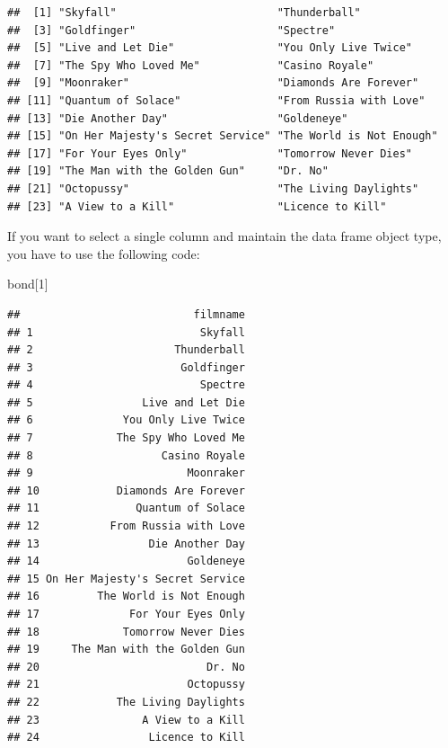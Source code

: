 \documentclass[
]{book}
\newenvironment{Shaded}{\begin{snugshade}}{\end{snugshade}}
\newcommand{\DecValTok}[1]{\textcolor[rgb]{0.00,0.00,0.81}{#1}}
\newcommand{\NormalTok}[1]{#1}
\begin{document}
\begin{verbatim}
##  [1] "Skyfall"                         "Thunderball"                    
##  [3] "Goldfinger"                      "Spectre"                        
##  [5] "Live and Let Die"                "You Only Live Twice"            
##  [7] "The Spy Who Loved Me"            "Casino Royale"                  
##  [9] "Moonraker"                       "Diamonds Are Forever"           
## [11] "Quantum of Solace"               "From Russia with Love"          
## [13] "Die Another Day"                 "Goldeneye"                      
## [15] "On Her Majesty's Secret Service" "The World is Not Enough"        
## [17] "For Your Eyes Only"              "Tomorrow Never Dies"            
## [19] "The Man with the Golden Gun"     "Dr. No"                         
## [21] "Octopussy"                       "The Living Daylights"           
## [23] "A View to a Kill"                "Licence to Kill"
\end{verbatim}

If you want to select a single column and maintain the data frame object type, you have to use the following code:

\begin{Shaded}
\begin{Highlighting}[]
\NormalTok{bond[}\DecValTok{1}\NormalTok{]}
\end{Highlighting}
\end{Shaded}

\begin{verbatim}
##                           filmname
## 1                          Skyfall
## 2                      Thunderball
## 3                       Goldfinger
## 4                          Spectre
## 5                 Live and Let Die
## 6              You Only Live Twice
## 7             The Spy Who Loved Me
## 8                    Casino Royale
## 9                        Moonraker
## 10            Diamonds Are Forever
## 11               Quantum of Solace
## 12           From Russia with Love
## 13                 Die Another Day
## 14                       Goldeneye
## 15 On Her Majesty's Secret Service
## 16         The World is Not Enough
## 17              For Your Eyes Only
## 18             Tomorrow Never Dies
## 19     The Man with the Golden Gun
## 20                          Dr. No
## 21                       Octopussy
## 22            The Living Daylights
## 23                A View to a Kill
## 24                 Licence to Kill
\end{verbatim}
\end{document}
